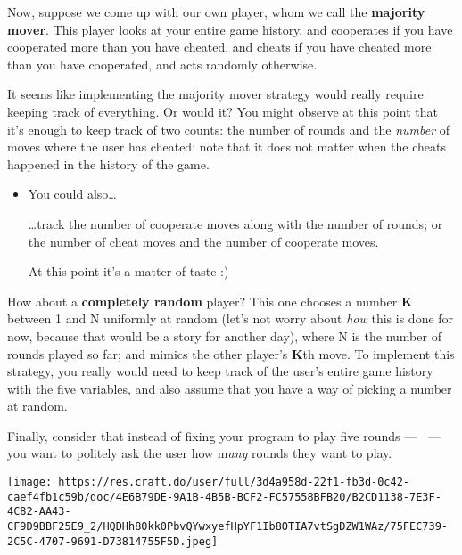 \documentclass[
  letterpaper,
  DIV=11,
  numbers=noendperiod]{scrreprt}
\begin{document}
Now, suppose we come up with our own player, whom we call the
\textbf{majority mover}. This player looks at your entire game history,
and cooperates if you have cooperated more than you have cheated, and
cheats if you have cheated more than you have cooperated, and acts
randomly otherwise.

It seems like implementing the majority mover strategy would really
require keeping track of everything. Or would it? You might observe at
this point that it's enough to keep track of two counts: the number of
rounds and the \emph{number} of moves where the user has cheated: note
that it does not matter when the cheats happened in the history of the
game.

\begin{itemize}
\item
  You could also\ldots{}

  \ldots track the number of cooperate moves along with the number of
  rounds; or the number of cheat moves and the number of cooperate
  moves.

  At this point it's a matter of taste :)
\end{itemize}

How about a \textbf{completely random} player? This one chooses a number
\textbf{K} between 1 and N uniformly at random (let's not worry about
\emph{how} this is done for now, because that would be a story for
another day), where N is the number of rounds played so far; and mimics
the other player's \textbf{K}th move. To implement this strategy, you
really would need to keep track of the user's entire game history with
the five variables, and also assume that you have a way of picking a
number at random.

Finally, consider that instead of fixing your program to play five
rounds --- 🥱 --- you want to politely ask the user how m\emph{any
}rounds they want to play.

\begin{tcolorbox}[standard jigsaw,titlerule=0mm, leftrule=.75mm, colbacktitle=quarto-callout-note-color!10!white, toptitle=1mm, toprule=.15mm, colframe=quarto-callout-note-color-frame, colback=white, coltitle=black, title=\textcolor{quarto-callout-note-color}{\faInfo}\hspace{0.5em}{After all\ldots{}}, bottomrule=.15mm, rightrule=.15mm, bottomtitle=1mm, left=2mm, opacitybacktitle=0.6, arc=.35mm, opacityback=0]
\texttt{[image: https://res.craft.do/user/full/3d4a958d-22f1-fb3d-0c42-caef4fb1c59b/doc/4E6B79DE-9A1B-4B5B-BCF2-FC57558BFB20/B2CD1138-7E3F-4C82-AA43-CF9D9BBF25E9\_2/HQDHh80kk0PbvQYwxyefHpYF1Ib8OTIA7vtSgDZW1WAz/75FEC739-2C5C-4707-9691-D73814755F5D.jpeg]}
\end{tcolorbox}
\end{document}
